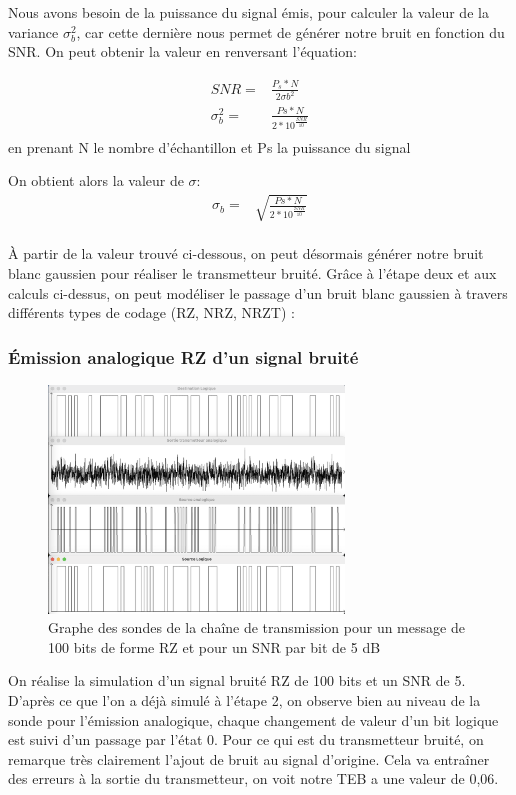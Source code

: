  Nous avons besoin de la puissance du signal émis, pour calculer la valeur de la variance $\sigma_b^2$, car cette dernière nous permet de générer notre bruit en fonction du SNR. On peut obtenir la valeur en renversant l'équation:

\begin{align*}
   SNR =& \frac{P_s * N}{2\sigma b^2}\\
   \sigma_b^2 =& \frac{Ps*N}{2*10^{\frac{SNR}{10}}}\\
\end{align*}
en prenant N le nombre d'échantillon et Ps la puissance du signal

On obtient alors la valeur de $\sigma$:
\begin{align*}
 \sigma_b =& \sqrt{\frac{Ps*N}{2*10^{\frac{SNR}{10}}}}\\
\end{align*}

À partir de la valeur trouvé ci-dessous, on peut désormais générer notre bruit blanc gaussien pour réaliser le transmetteur bruité. Grâce à l'étape deux et aux calculs ci-dessus, on peut modéliser le passage d'un bruit blanc gaussien à travers différents types de codage (RZ, NRZ, NRZT) :

\subsubsection{Émission analogique RZ d'un signal bruité}
\begin{figure}[H]
    \centering
    \includegraphics[width=0.7\textwidth]{img/etape3_emission_RZ_bruite.png}
    \caption{Graphe des sondes de la chaîne de transmission pour un message de 100 bits de forme RZ et pour un SNR par bit de 5 dB}
    \label{fig:etape_3_RZ_bruite}
\end{figure}

On réalise la simulation d'un signal bruité RZ de 100 bits et un SNR de 5. D'après ce que l'on a déjà simulé à l'étape 2, on observe bien au niveau de la sonde pour l'émission analogique, chaque changement de valeur d'un bit logique est suivi d'un passage par l'état 0. Pour ce qui est du transmetteur bruité, on remarque très clairement l'ajout de bruit au signal d'origine. Cela va entraîner des erreurs à la sortie du transmetteur, on voit notre TEB a une valeur de 0,06.

